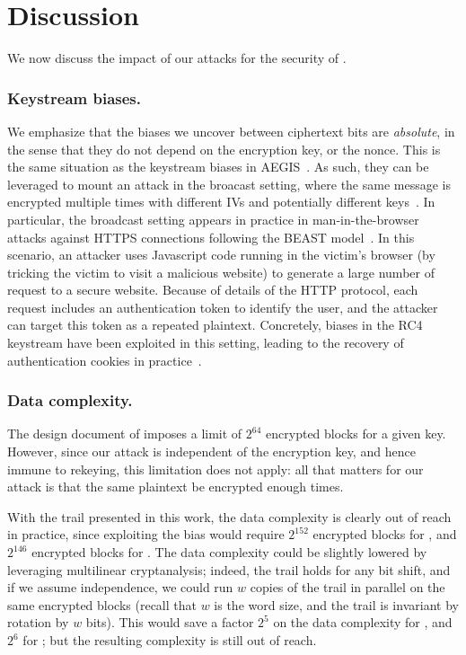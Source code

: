 \section{Discussion}
\label{sec/Discussion}


We now discuss the impact of our attacks for the security of \morus.

\subsubsection{Keystream biases.}

We emphasize that the biases we uncover between ciphertext bits are
\emph{absolute}, in the sense that they do not depend on the encryption
key, or the nonce.  This is the same situation as the keystream biases
in AEGIS~\cite{sacryptMinaud14}.  As such, they can be leveraged to
mount an attack in the broacast setting, where the same message is
encrypted multiple times with different IVs and potentially different
keys~\cite{DBLP:conf/fse/MantinS01}.  In particular, the broadcast setting appears
in practice in man-in-the-browser attacks against HTTPS connections
following the BEAST model~\cite{duong2011here}.  In this scenario, an
attacker uses Javascript code running in the victim's browser (by
tricking the victim to visit a malicious website) to generate a large
number of request to a secure website.  Because of details of the HTTP
protocol, each request includes an authentication token to identify the
user, and the attacker can target this token as a repeated plaintext.
Concretely, biases in the RC4 keystream have been exploited in this
setting, leading to the recovery of authentication cookies in
practice~\cite{DBLP:conf/uss/AlFardanBPPS13}.

\subsubsection{Data complexity.}

The design document of  imposes a limit of $2^{64}$
encrypted blocks for a given key. However, since our attack is
independent of the encryption key, and hence immune to rekeying, this
limitation does not apply: all that matters for our attack is that the
same plaintext be encrypted enough times.

With the trail presented in this work, the data complexity is clearly
out of reach in practice, since exploiting the bias would require
$2^{152}$ encrypted blocks for , and $2^{146}$
encrypted blocks for . The data complexity could be
slightly lowered by leveraging multilinear cryptanalysis; indeed, the
trail holds for any bit shift, and if we assume independence, we could
run $w$ copies of the trail in parallel on the same encrypted blocks
(recall that $w$ is the word size, and the trail is invariant by
rotation by $w$ bits). This would save a factor $2^5$ on the data
complexity for , and $2^6$ for ; but
the resulting complexity is still out of reach.

